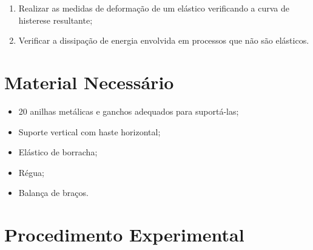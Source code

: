 \begin{enumerate}
	\item Realizar as medidas de deformação de um elástico verificando a curva de histerese resultante;
	\item Verificar a dissipação de energia envolvida em processos que não são elásticos. 
\end{enumerate}

\section{Material Necessário}

\begin{itemize}
	\item 20 anilhas metálicas e ganchos adequados para suportá-las;
	\item Suporte vertical com haste horizontal;
	\item Elástico de borracha;
	\item Régua;
	\item Balança de braços.
\end{itemize}

\section{Procedimento Experimental}

